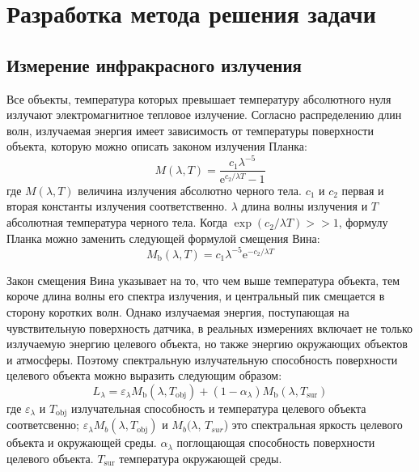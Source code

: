 \chapter{Разработка метода решения задачи} \label{ch3}
	
\section{Измерение инфракрасного излучения} \label{ch3:sec1}

Все объекты, температура которых превышает температуру абсолютного нуля излучают электромагнитное тепловое излучение. Согласно распределению длин волн, излучаемая энергия имеет зависимость от температуры поверхности объекта, которую можно описать законом излучения Планка:
\begin{equation} 
M(\lambda, T)=\frac{c_1 \lambda^{-5}}{\mathrm{e}^{c_2 / \lambda T}-1}
\end{equation} 
где $M(\lambda, T)$ величина излучения абсолютно черного тела. $c_1$ и $c_2$ первая и вторая константы излучения соответственно. $\lambda$ длина волны излучения и $T$ абсолютная температура черного тела. Когда $\exp \left(c_2 / \lambda T\right)>>1$, формулу Планка можно заменить следующей формулой смещения Вина:
\begin{equation} 
M_{\mathrm{b}}(\lambda, T)=c_1 \lambda^{-5} \mathrm{e}^{-c_2 / \lambda T}
\end{equation} 

Закон смещения Вина указывает на то, что чем выше температура объекта, тем короче длина волны его спектра излучения, и центральный пик смещается в сторону коротких волн. Однако излучаемая энергия, поступающая на чувствительную поверхность датчика, в реальных измерениях включает не только излучаемую энергию целевого объекта, но также энергию окружающих объектов и атмосферы. Поэтому спектральную излучательную способность поверхности целевого объекта можно выразить следующим образом:
\begin{equation} 
L_\lambda=\varepsilon_\lambda M_{\mathrm{b}}\left(\lambda, T_{\mathrm{obj}}\right)+\left(1-\alpha_\lambda\right) M_{\mathrm{b}}\left(\lambda, T_{\mathrm{sur}}\right)
\end{equation} 
где $\varepsilon_\lambda$ и $T_{\mathrm{obj}}$ излучательная способность и температура целевого объекта соответсвенно; $\varepsilon_\lambda M_b\left(\lambda, T_{\mathrm{obj}}\right)$ и $M_b(\lambda$, $T_{sur}$) это спектральная яркость целевого объекта и окружающей среды. $\alpha_\lambda$ поглощающая способность поверхности целевого объекта. $T_{\mathrm{sur}}$ температура окружающей среды.

